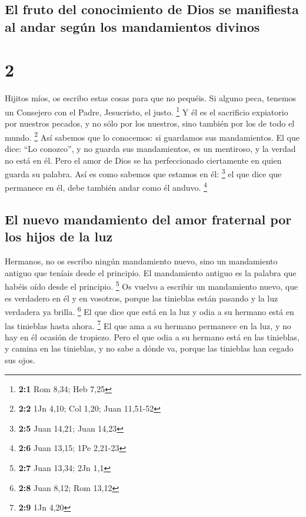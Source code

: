 \hypertarget{el-fruto-del-conocimiento-de-dios-se-manifiesta-al-andar-seguxfan-los-mandamientos-divinos}{%
\subsection{El fruto del conocimiento de Dios se manifiesta al andar
según los mandamientos
divinos}\label{el-fruto-del-conocimiento-de-dios-se-manifiesta-al-andar-seguxfan-los-mandamientos-divinos}}

\hypertarget{section-1}{%
\section{2}\label{section-1}}

 Hijitos míos, os escribo estas cosas para que no pequéis.
Si alguno peca, tenemos un Consejero con el Padre, Jesucristo, el justo.
\footnote{\textbf{2:1} Rom 8,34; Heb 7,25}  Y él es el
sacrificio expiatorio por nuestros pecados, y no sólo por los nuestros,
sino también por los de todo el mundo. \footnote{\textbf{2:2} 1Jn 4,10;
  Col 1,20; Juan 11,51-52}  Así sabemos que lo conocemos:
si guardamos sus mandamientos.  El que dice: ``Lo
conozco'', y no guarda sus mandamientos, es un mentiroso, y la verdad no
está en él.  Pero el amor de Dios se ha perfeccionado
ciertamente en quien guarda su palabra. Así es como sabemos que estamos
en él: \footnote{\textbf{2:5} Juan 14,21; Juan 14,23}  el
que dice que permanece en él, debe también andar como él anduvo.
\footnote{\textbf{2:6} Juan 13,15; 1Pe 2,21-23}

\hypertarget{el-nuevo-mandamiento-del-amor-fraternal-por-los-hijos-de-la-luz}{%
\subsection{El nuevo mandamiento del amor fraternal por los hijos de la
luz}\label{el-nuevo-mandamiento-del-amor-fraternal-por-los-hijos-de-la-luz}}

 Hermanos, no os escribo ningún mandamiento nuevo, sino un
mandamiento antiguo que teníais desde el principio. El mandamiento
antiguo es la palabra que habéis oído desde el principio. \footnote{\textbf{2:7}
  Juan 13,34; 2Jn 1,1}  Os vuelvo a escribir un
mandamiento nuevo, que es verdadero en él y en vosotros, porque las
tinieblas están pasando y la luz verdadera ya brilla. \footnote{\textbf{2:8}
  Juan 8,12; Rom 13,12}  El que dice que está en la luz y
odia a su hermano está en las tinieblas hasta ahora. \footnote{\textbf{2:9}
  1Jn 4,20}  El que ama a su hermano permanece en la luz,
y no hay en él ocasión de tropiezo.  Pero el que odia a
su hermano está en las tinieblas, y camina en las tinieblas, y no sabe a
dónde va, porque las tinieblas han cegado sus ojos.

